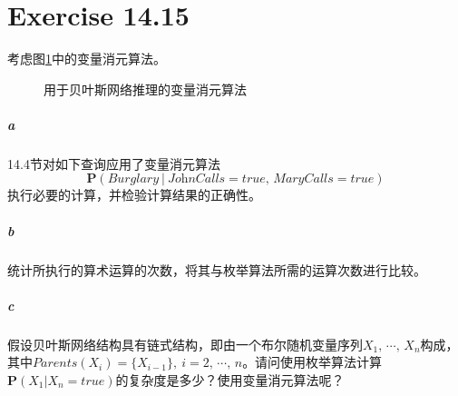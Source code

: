 \documentclass{article}
\begin{document}
\section{Exercise 14.15}
考虑图\ref{14.11}中的变量消元算法。
\begin{figure}
    \centering
    \caption{用于贝叶斯网络推理的变量消元算法}
    \label{14.11}
\end{figure}
\subparagraph{a} 14.4节对如下查询应用了变量消元算法$$\mathbf{P}(\textit{Burglary}\ |\ \textit{JohnCalls} = \textit{true},\, \textit{MaryCalls} = \textit{true})$$执行必要的计算，并检验计算结果的正确性。
\subparagraph{b} 统计所执行的算术运算的次数，将其与枚举算法所需的运算次数进行比较。
\subparagraph{c} 假设贝叶斯网络结构具有链式结构，即由一个布尔随机变量序列$X_1,\, \cdots,\, X_n$构成，其中$\textit{Parents}(X_i) = \{X_{i - 1}\},\ i = 2,\, \cdots,\, n$。请问使用枚举算法计算$\mathbf{P}(X_1 | X_n = \textit{true})$的复杂度是多少？使用变量消元算法呢？
\end{document}
